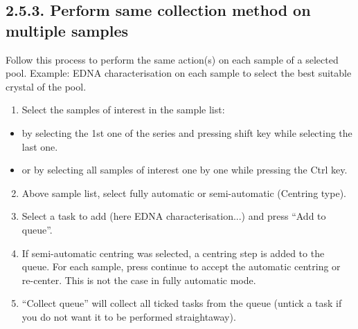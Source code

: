 \documentclass[a4paper,10pt,english]{sphinxmanual}
\begin{document}
\subsection{2.5.3. Perform same collection method on multiple samples}
\label{user_manual:perform-same-collection-method-on-multiple-samples}
Follow this process to perform the same action(s) on each sample of a selected pool.
Example: EDNA characterisation on each sample to select the best suitable crystal of the pool.
\begin{enumerate}
\item {} 
Select the samples of interest in the sample list:

\end{enumerate}
\begin{itemize}
\item {} 
by selecting the 1st one of the series and pressing shift key while selecting the last one.

\item {} 
or by selecting all samples of interest one by one while pressing the Ctrl key.

\end{itemize}
\begin{enumerate}
\setcounter{enumi}{1}
\item {} 
Above sample list, select fully automatic or semi-automatic (Centring type).

\item {} 
Select a task to add (here EDNA characterisation...) and press “Add to queue”.

\item {} 
If semi-automatic centring was selected, a centring step is added to the queue. For each sample, press continue to accept the automatic centring or re-center. This is not the case in fully automatic mode.

\item {} 
“Collect queue” will collect all ticked tasks from the queue (untick a task if you do not want it to be performed straightaway).

\end{enumerate}
\end{document}
